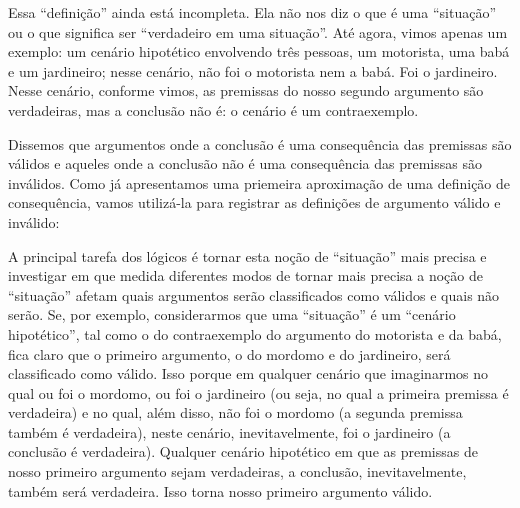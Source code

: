
Essa ``definição'' ainda está incompleta. Ela não nos diz o que é uma ``situação'' ou o que significa ser ``verdadeiro em uma situação''.
Até agora, vimos apenas um exemplo:
um cenário hipotético envolvendo três pessoas, um motorista, uma babá e um jardineiro; nesse cenário, não foi o motorista nem a babá. Foi o jardineiro. Nesse cenário, conforme vimos, as premissas do nosso segundo argumento são verdadeiras, mas a conclusão não é:
o cenário é um contraexemplo.

Dissemos que argumentos onde a conclusão é uma consequência das premissas são válidos e aqueles onde a conclusão não é uma consequência das premissas são inválidos.
Como já apresentamos uma priemeira aproximação de uma definição de consequência, vamos utilizá-la para registrar as definições de argumento válido e inválido:





A principal tarefa dos lógicos é tornar esta noção de ``situação'' mais precisa e investigar em que medida diferentes modos de tornar mais precisa a noção de ``situação'' afetam quais argumentos serão classificados como válidos e quais não serão. 
Se, por exemplo, considerarmos que uma ``situação'' é um ``cenário hipotético'', tal como o do contraexemplo do argumento do motorista e da babá, fica claro que o primeiro argumento, o do mordomo e do jardineiro, será classificado como válido.
Isso porque em qualquer cenário que imaginarmos no qual ou foi o mordomo, ou foi o jardineiro (ou seja, no qual a primeira premissa é verdadeira) e no qual, além disso, não foi o mordomo (a segunda premissa também é verdadeira), neste cenário, inevitavelmente, foi o jardineiro (a conclusão é verdadeira).
Qualquer cenário hipotético em que as premissas de nosso primeiro argumento sejam verdadeiras, a conclusão, inevitavelmente, também será verdadeira.
Isso torna nosso primeiro argumento válido.


